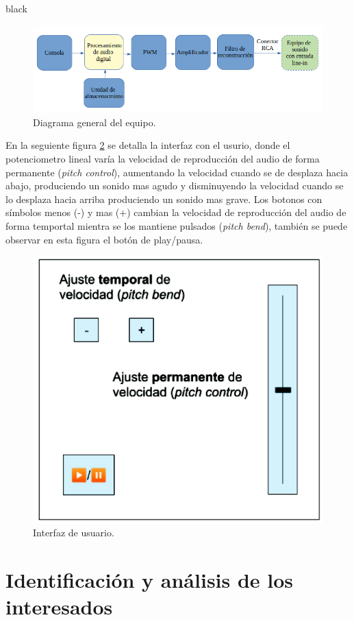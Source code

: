 \documentclass[11pt]{charter}
\begin{document}
\begin{consigna}{black}
\begin{figure}[htpb]
\centering 
\includegraphics[width=.9\textwidth]{./Figuras/diagBloquesDSP.png}
\caption{Diagrama general del equipo.}
\label{fig:diagBloques}
\end{figure}

En la seguiente figura \ref{fig:consola} se detalla la interfaz con el usurio, donde el potenciometro lineal varía la velocidad de reproducción del audio de forma permanente (\textit{pitch control}), aumentando la velocidad cuando se de desplaza hacia abajo, produciendo un sonido mas agudo y disminuyendo la velocidad cuando se lo desplaza hacia arriba produciendo un sonido mas grave. Los botonos con símbolos menos (-) y mas (+) cambian la velocidad de reproducción del audio de forma temportal mientra se los mantiene pulsados (\textit{pitch bend}), también se puede observar en esta figura el botón de play/pausa.

\begin{figure}[htpb]
\centering 
\includegraphics[width=.5\textwidth]{./Figuras/interfaz.png}
\caption{Interfaz de usuario.}
\label{fig:consola}
\end{figure}

\end{consigna}
\section{Identificación y análisis de los interesados}
\label{sec:interesados}
\end{document}
